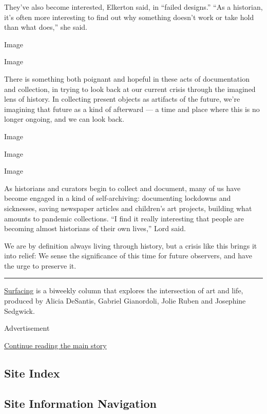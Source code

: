 They've also become interested, Elkerton said, in ``failed designs.''
``As a historian, it's often more interesting to find out why something
doesn't work or take hold than what does,'' she said.

Image

Image

There is something both poignant and hopeful in these acts of
documentation and collection, in trying to look back at our current
crisis through the imagined lens of history. In collecting present
objects as artifacts of the future, we're imagining that future as a
kind of afterward --- a time and place where this is no longer ongoing,
and we can look back.

Image

Image

Image

As historians and curators begin to collect and document, many of us
have become engaged in a kind of self-archiving: documenting lockdowns
and sicknesses, saving newspaper articles and children's art projects,
building what amounts to pandemic collections. ``I find it really
interesting that people are becoming almost historians of their own
lives,'' Lord said.

We are by definition always living through history, but a crisis like
this brings it into relief: We sense the significance of this time for
future observers, and have the urge to preserve it.

\begin{center}\rule{0.5\linewidth}{\linethickness}\end{center}

\href{https://www.nytimes.com/series/surfacing}{Surfacing} is a biweekly
column that explores the intersection of art and life, produced by
Alicia DeSantis, Gabriel Gianordoli, Jolie Ruben and Josephine Sedgwick.

Advertisement

\protect\hyperlink{after-bottom}{Continue reading the main story}

\hypertarget{site-index}{%
\subsection{Site Index}\label{site-index}}

\hypertarget{site-information-navigation}{%
\subsection{Site Information
Navigation}\label{site-information-navigation}}

